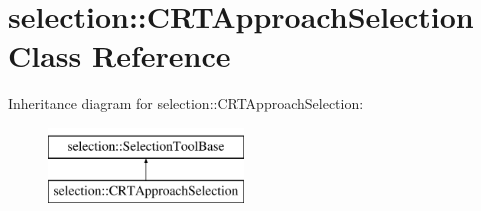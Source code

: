 \hypertarget{classselection_1_1CRTApproachSelection}{\section{selection\-:\-:C\-R\-T\-Approach\-Selection Class Reference}
\label{classselection_1_1CRTApproachSelection}
}
Inheritance diagram for selection\-:\-:C\-R\-T\-Approach\-Selection\-:\begin{figure}[H]
\begin{center}
\leavevmode
\includegraphics[height=2.000000cm]{classselection_1_1CRTApproachSelection}
\end{center}
\end{figure}
